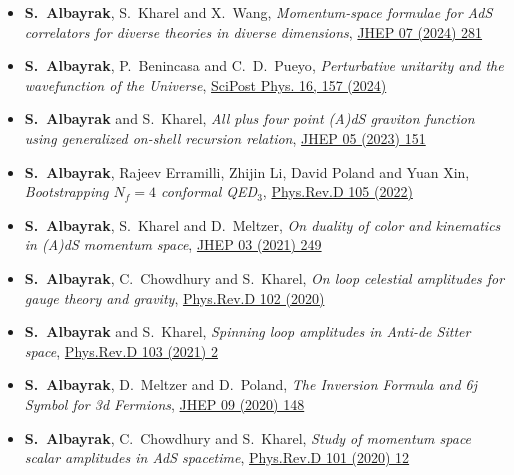 \documentclass[a4paper,11pt]{article}
\begin{document}
 \begin{itemize}%
  	 \item[] {\bf S.~Albayrak}, {S.~Kharel} and {X.~Wang}, \emph{Momentum-space formulae for AdS correlators for diverse theories in diverse dimensions}, \hyperref{https://inspirehep.net/literature/2729950}{}{}{JHEP 07 (2024) 281} 
 
  	 \item[] {\bf S.~Albayrak}, {P.~Benincasa} and {C.~D.~Pueyo}, \emph{Perturbative unitarity and the wavefunction of the Universe}, \hyperref{https://doi.org/10.21468/SciPostPhys.16.6.157}{}{}{SciPost Phys. 16, 157 (2024)} 
  	 
 	 \item[] {\bf S.~Albayrak} and  { S.~Kharel}, \emph{All plus four point (A)dS graviton function using generalized on-shell recursion relation}, \hyperref{https://inspirehep.net/literature/2634747}{}{}{JHEP 05 (2023) 151} 
 	
  	\item[] {\bf S.~Albayrak}, Rajeev Erramilli, Zhijin Li, David Poland  and Yuan Xin, \emph{Bootstrapping $N_f=4$ conformal QED$_3$}, \hyperref{https://inspirehep.net/literature/1984752}{}{}{Phys.Rev.D 105 (2022)}
 	
  	\item[] {\bf S.~Albayrak}, { S.~Kharel} and {D.~Meltzer}, \emph{On duality of color and kinematics in (A)dS momentum space}, \hyperref{https://inspirehep.net/literature/1837623}{}{}{JHEP 03 (2021) 249}
 	\item[] {\bf S.~Albayrak}, C.~Chowdhury and  { S.~Kharel}, \emph{On loop celestial amplitudes for gauge theory and gravity}, \hyperref{https://inspirehep.net/literature/1807927}{}{}{ Phys.Rev.D 102 (2020)}
 	
 \item[] {\bf S.~Albayrak} and  { S.~Kharel}, \emph{Spinning loop amplitudes in Anti-de Sitter space}, \hyperref{https://inspirehep.net/literature/1802534}{}{}{Phys.Rev.D 103 (2021) 2} 
 
 \item[] {\bf S.~Albayrak}, D.~Meltzer and  { D.~Poland}, \emph{The Inversion Formula and 6j Symbol for 3d Fermions}, \hyperref{https://inspirehep.net/files/ff4743ee85b68ab8565052dbd4928f62}{}{}{JHEP 09 (2020) 148}
 
 \item[] {\bf S.~Albayrak}, C.~Chowdhury and  { S.~Kharel}, \emph{Study of momentum space scalar amplitudes in AdS spacetime}, \hyperref{https://inspirehep.net/files/950d888f8dbaf39b96ea1bee25d6bda0}{}{}{Phys.Rev.D 101 (2020) 12}
 

\end{itemize}
\end{document}
